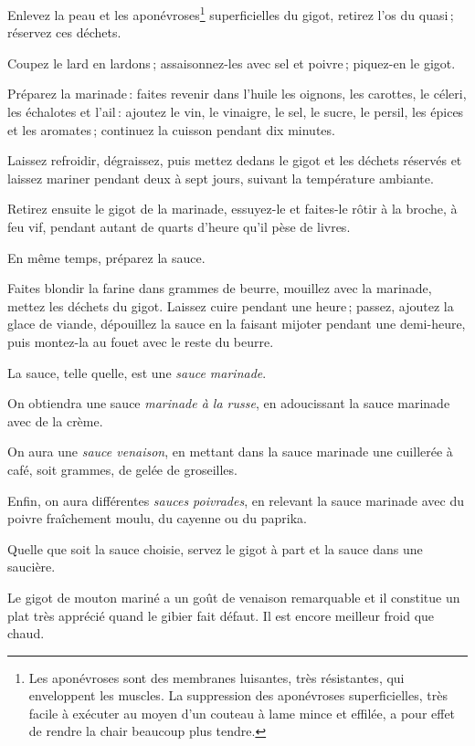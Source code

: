 Enlevez la peau et les aponévroses\footnote{ Les aponévroses sont des membranes
luisantes, très résistantes, qui enveloppent les muscles. La suppression des
aponévroses superficielles, très facile à exécuter au moyen d'un couteau à lame
mince et effilée, a pour effet de rendre la chair beaucoup plus tendre.}
superficielles du gigot, retirez l'os du quasi ; réservez ces déchets.

Coupez le lard en lardons ; assaisonnez-les avec sel et poivre ; piquez-en le
gigot.

Préparez la marinade : faites revenir dans l'huile les oignons, les carottes,
le céleri, les échalotes et l'ail : ajoutez le vin, le vinaigre, le sel, le
sucre, le persil, les épices et les aromates ; continuez la cuisson pendant dix
minutes.

Laissez refroidir, dégraissez, puis mettez dedans le gigot et les déchets
réservés et laissez mariner pendant deux à sept jours, suivant la température
ambiante.

Retirez ensuite le gigot de la marinade, essuyez-le et faites-le rôtir à la broche,
à feu vif, pendant autant de quarts d'heure qu'il pèse de livres.

En même temps, préparez la sauce.

Faites blondir la farine dans {\mmm} grammes de beurre, mouillez avec la
marinade, mettez les déchets du gigot. Laissez cuire pendant une heure ;
passez, ajoutez la glace de viande, dépouillez la sauce en la faisant mijoter
pendant une demi-heure, puis montez-la au fouet avec le reste du beurre.

La sauce, telle quelle, est une \textit{sauce marinade}.

On obtiendra une sauce \textit{marinade à la russe}, en adoucissant la sauce
marinade avec de la crème.

On aura une \textit{sauce venaison}, en mettant dans la sauce marinade une
cuillerée à café, soit {\mmm} grammes, de gelée de groseilles.

Enfin, on aura différentes \textit{sauces poivrades}, en relevant la sauce
marinade avec du poivre fraîchement moulu, du cayenne ou du paprika.

Quelle que soit la sauce choisie, servez le gigot à part et la sauce dans une
saucière.

Le gigot de mouton mariné a un goût de venaison remarquable et il constitue un
plat très apprécié quand le gibier fait défaut. Il est encore meilleur froid
que chaud.

\sk

